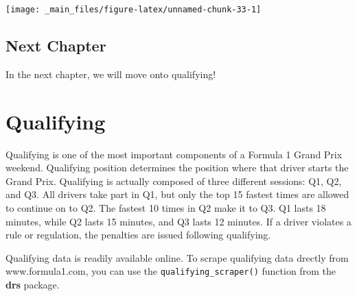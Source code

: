 \documentclass[
]{book}
\begin{document}
\begin{center}\texttt{[image: \_main\_files/figure-latex/unnamed-chunk-33-1]} \end{center}

\hypertarget{next-chapter}{%
\section{Next Chapter}\label{next-chapter}}

In the next chapter, we will move onto qualifying!

\hypertarget{qualifying}{%
\chapter{Qualifying}\label{qualifying}}

Qualifying is one of the most important components of a Formula 1 Grand Prix weekend. Qualifying position determines the position where that driver starts the Grand Prix. Qualifying is actually composed of three different sessions: Q1, Q2, and Q3. All drivers take part in Q1, but only the top 15 fastest times are allowed to continue on to Q2. The fastest 10 times in Q2 make it to Q3. Q1 lasts 18 minutes, while Q2 lasts 15 minutes, and Q3 lasts 12 minutes. If a driver violates a rule or regulation, the penalties are issued following qualifying.

Qualifying data is readily available online. To scrape qualifying data drectly from www.formula1.com, you can use the \texttt{qualifying\_scraper()} function from the \textbf{drs} package.
\end{document}
